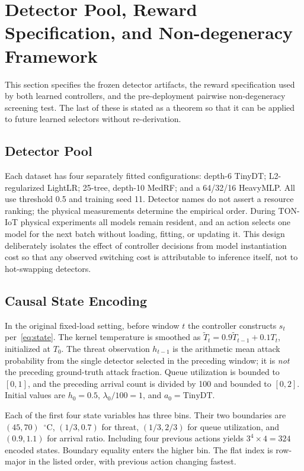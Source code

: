 \section{Detector Pool, Reward Specification, and Non-degeneracy Framework}
\label{sec:methods}
This section specifies the frozen detector artifacts, the reward specification used by both learned controllers, and the pre-deployment pairwise non-degeneracy screening test. The last of these is stated as a theorem so that it can be applied to future learned selectors without re-derivation.

\subsection{Detector Pool}
Each dataset has four separately fitted configurations: depth-6 TinyDT; L2-regularized LightLR; 25-tree, depth-10 MedRF; and a 64/32/16 HeavyMLP. All use threshold 0.5 and training seed 11. Detector names do not assert a resource ranking; the physical measurements determine the empirical order. During TON-IoT physical experiments all models remain resident, and an action selects one model for the next batch without loading, fitting, or updating it. This design deliberately isolates the effect of controller decisions from model instantiation cost so that any observed switching cost is attributable to inference itself, not to hot-swapping detectors.

\subsection{Causal State Encoding}
In the original fixed-load setting, before window $t$ the controller constructs $s_t$ per~\eqref{eq:state}. The kernel temperature is smoothed as $\widetilde T_t=0.9\widetilde T_{t-1}+0.1T_t$, initialized at $T_0$. The threat observation $h_{t-1}$ is the arithmetic mean attack probability from the single detector selected in the preceding window; it is \emph{not} the preceding ground-truth attack fraction. Queue utilization is bounded to $[0,1]$, and the preceding arrival count is divided by 100 and bounded to $[0,2]$. Initial values are $h_0=0.5$, $\lambda_0/100=1$, and $a_0=\text{TinyDT}$.

Each of the first four state variables has three bins. Their two boundaries are $(45,70)$~$^{\circ}$C, $(1/3,0.7)$ for threat, $(1/3,2/3)$ for queue utilization, and $(0.9,1.1)$ for arrival ratio. Including four previous actions yields $3^4\times 4=324$ encoded states. Boundary equality enters the higher bin. The flat index is row-major in the listed order, with previous action changing fastest.

